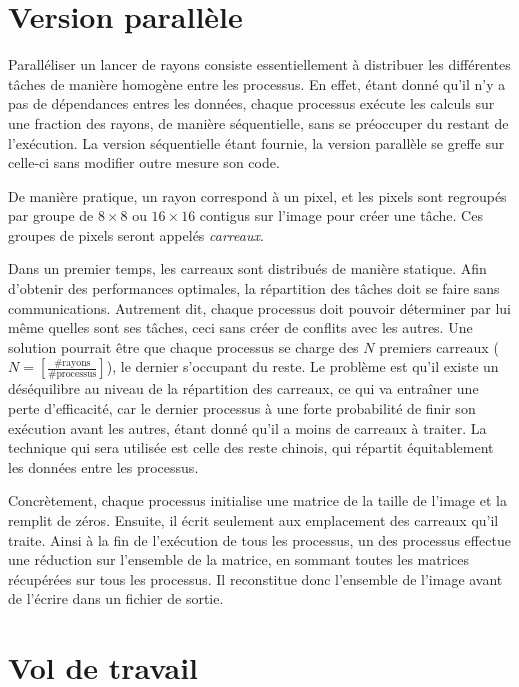 \documentclass[a4paper,11pt]{article}
\begin{document}
\section{Version parallèle}

Paralléliser un lancer de rayons consiste essentiellement à distribuer les différentes tâches de manière homogène entre les processus. En effet, étant donné qu'il n'y  a pas de dépendances entres les données, chaque processus exécute les calculs sur une fraction des rayons, de manière séquentielle, sans se préoccuper du restant de l'exécution. La version séquentielle étant fournie, la version parallèle se greffe sur celle-ci sans modifier outre mesure son code.

De manière pratique, un rayon correspond à un pixel, et les pixels sont regroupés par groupe de $8 \times 8$ ou $16 \times 16$ contigus sur l'image pour créer une tâche. Ces groupes de pixels seront appelés \emph{carreaux}. 

Dans un premier temps, les carreaux sont distribués de manière statique. Afin d'obtenir des performances optimales, la répartition des tâches doit se faire sans communications. Autrement dit, chaque processus doit pouvoir déterminer par lui même quelles sont ses tâches, ceci sans créer de conflits avec les autres. Une solution pourrait être que chaque processus se charge des $N$ premiers carreaux ($N = \left[\frac{\#\mathrm{rayons}}{\#\mathrm{processus}}\right]$), le dernier s'occupant du reste. 
Le problème est qu'il existe un déséquilibre au niveau de la répartition des carreaux, ce qui va entraîner une perte d'efficacité, car le dernier processus à une forte probabilité de finir son exécution avant les autres, étant donné qu'il a moins de carreaux à traiter. La technique qui sera utilisée est celle des reste chinois, qui répartit équitablement les données entre les processus.

Concrètement, chaque processus initialise une matrice de la taille de l'image et la remplit de zéros. Ensuite, il écrit seulement aux emplacement des carreaux qu'il traite. Ainsi à la fin de l'exécution de tous les processus, un des processus effectue une réduction sur l'ensemble de la matrice, en sommant toutes les matrices récupérées sur tous les processus. Il reconstitue donc l'ensemble de l'image avant de l'écrire dans un fichier de sortie.


\section{Vol de travail}
\end{document}
